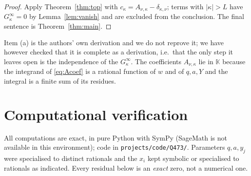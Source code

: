 \documentclass[11pt]{article}
\theoremstyle{definition}
\theoremstyle{remark}
\newcommand{\KK}{\mathbb{K}}
\newcommand{\Gi}[1]{G^{\infty}_{#1}}
\begin{document}
\begin{proof}
Apply Theorem~\ref{thm:top} with $c_\kappa=A_{\nu,\kappa}-\delta_{\kappa,\nu}$; terms with
$|\kappa|>L$ have $\Gi\kappa=0$ by Lemma~\ref{lem:vanish} and are excluded from the
conclusion. The final sentence is Theorem~\ref{thm:main}.
\end{proof}

Item (a) is the authors' own derivation and we do not reprove it; we have however checked that
it is complete as a derivation, i.e.\ that the only step it leaves open is the independence of
the $\Gi\kappa$. The coefficients $A_{\nu,\kappa}$ lie in $\KK$ because the integrand of
\eqref{eq:Acoef} is a rational function of $w$ and of $q,a,Y$ and the integral is a finite sum
of its residues.

\section{Computational verification}\label{sec:verif}

All computations are exact, in pure Python with SymPy (SageMath is not available in this
environment); code in \texttt{projects/code/Q473/}. Parameters $q,a,y_j$ were specialised to
distinct rationals and the $x_i$ kept symbolic or specialised to rationals as indicated. Every
residual below is an \emph{exact} zero, not a numerical one.
\end{document}
